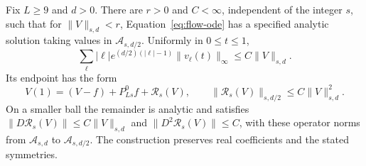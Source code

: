 \begin{lemma}\label{lem:flow-analytic}
Fix \(L\ge9\) and \(d>0\).  There are \(r>0\) and \(C<\infty\),
independent of the integer \(s\), such that for
\(\|V\|_{s,d}<r\), Equation~\eqref{eq:flow-ode} has a specified analytic
solution taking values in \(\mathcal A_{s,d/2}\).  Uniformly in
\(0\le t\le1\),
\begin{equation}\label{eq:flow-intermediate}
 \sum_\ell |\ell|e^{(d/2)(|\ell|-1)}
 \|v_\ell(t)\|_\infty\le C\|V\|_{s,d}.
\end{equation}
Its endpoint has the form
\begin{equation}\label{eq:flow-before-compression}
 V(1)=(V-f)+P^0_{Ls}f+\mathcal R_s(V),\qquad
 \|\mathcal R_s(V)\|_{s,d/2}\le C\|V\|_{s,d}^2.
\end{equation}
On a smaller ball the remainder is analytic and satisfies
\(\|D\mathcal R_s(V)\|\le C\|V\|_{s,d}\) and
\(\|D^2\mathcal R_s(V)\|\le C\), with these operator norms from
\(\mathcal A_{s,d}\) to \(\mathcal A_{s,d/2}\).
The construction preserves real coefficients and the stated symmetries.
\end{lemma}

